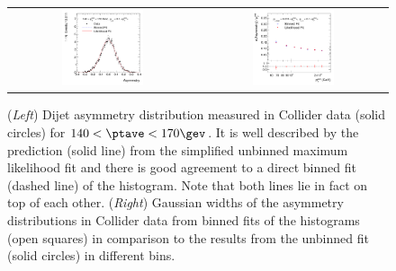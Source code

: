 \begin{figure}[ht]
 \centering
  \begin{tabular}{cc}
    \includegraphics[width=0.45\textwidth]{figures/MaxLikeSimple_Data132440-144011_Eta00-13_PtAsymmetry_PtBin4_Pt3Cut3} &
    \includegraphics[width=0.45\textwidth]{figures/MaxLikeSimple_Data132440-144011_Eta00-13_PtAsymmetryWidthBottomRatio_Pt3Cut3} \\
\end{tabular}
 \caption{(\textit{Left}) Dijet asymmetry distribution measured in
    Collider data (solid circles) for \mbox{$140 < \ptave < 170\gev$}.
    It is well described by the prediction (solid line) from the
    simplified unbinned maximum likelihood fit and there is good agreement to a direct binned
    fit (dashed line) of the histogram.
    Note that both lines lie in fact on top of each other.
    (\textit{Right}) Gaussian widths of the asymmetry distributions in
    Collider data from binned fits of the
    histograms (open squares) in comparison to the results from
    the unbinned fit (solid circles) in different \ptave bins.}
  \label{fig:ResFit:DataDriven:Simple}
\end{figure}

